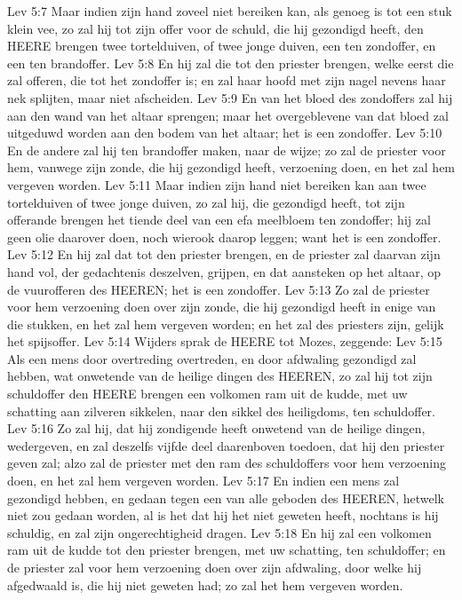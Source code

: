Lev 5:7  Maar indien zijn hand zoveel niet bereiken kan, als genoeg is tot een stuk klein vee, zo zal hij tot zijn offer voor de schuld, die hij gezondigd heeft, den HEERE brengen twee tortelduiven, of twee jonge duiven, een ten zondoffer, en een ten brandoffer.
Lev 5:8  En hij zal die tot den priester brengen, welke eerst die zal offeren, die tot het zondoffer is; en zal haar hoofd met zijn nagel nevens haar nek splijten, maar niet afscheiden.
Lev 5:9  En van het bloed des zondoffers zal hij aan den wand van het altaar sprengen; maar het overgeblevene van dat bloed zal uitgeduwd worden aan den bodem van het altaar; het is een zondoffer.
Lev 5:10  En de andere zal hij ten brandoffer maken, naar de wijze; zo zal de priester voor hem, vanwege zijn zonde, die hij gezondigd heeft, verzoening doen, en het zal hem vergeven worden.
Lev 5:11  Maar indien zijn hand niet bereiken kan aan twee tortelduiven of twee jonge duiven, zo zal hij, die gezondigd heeft, tot zijn offerande brengen het tiende deel van een efa meelbloem ten zondoffer; hij zal geen olie daarover doen, noch wierook daarop leggen; want het is een zondoffer.
Lev 5:12  En hij zal dat tot den priester brengen, en de priester zal daarvan zijn hand vol, der gedachtenis deszelven, grijpen, en dat aansteken op het altaar, op de vuurofferen des HEEREN; het is een zondoffer.
Lev 5:13  Zo zal de priester voor hem verzoening doen over zijn zonde, die hij gezondigd heeft in enige van die stukken, en het zal hem vergeven worden; en het zal des priesters zijn, gelijk het spijsoffer.
Lev 5:14  Wijders sprak de HEERE tot Mozes, zeggende:
Lev 5:15  Als een mens door overtreding overtreden, en door afdwaling gezondigd zal hebben, wat onwetende van de heilige dingen des HEEREN, zo zal hij tot zijn schuldoffer den HEERE brengen een volkomen ram uit de kudde, met uw schatting aan zilveren sikkelen, naar den sikkel des heiligdoms, ten schuldoffer.
Lev 5:16  Zo zal hij, dat hij zondigende heeft onwetend van de heilige dingen, wedergeven, en zal deszelfs vijfde deel daarenboven toedoen, dat hij den priester geven zal; alzo zal de priester met den ram des schuldoffers voor hem verzoening doen, en het zal hem vergeven worden.
Lev 5:17  En indien een mens zal gezondigd hebben, en gedaan tegen een van alle geboden des HEEREN, hetwelk niet zou gedaan worden, al is het dat hij het niet geweten heeft, nochtans is hij schuldig, en zal zijn ongerechtigheid dragen.
Lev 5:18  En hij zal een volkomen ram uit de kudde tot den priester brengen, met uw schatting, ten schuldoffer; en de priester zal voor hem verzoening doen over zijn afdwaling, door welke hij afgedwaald is, die hij niet geweten had; zo zal het hem vergeven worden.
